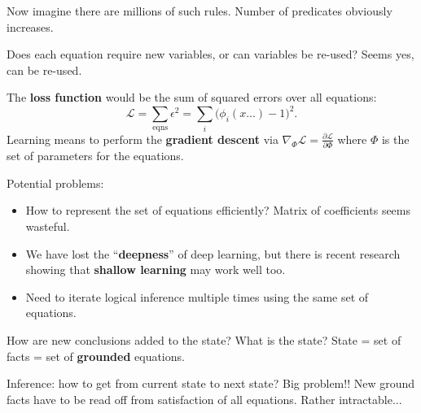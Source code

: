 Now imagine there are millions of such rules.  Number of predicates obviously increases.

Does each equation require new variables, or can variables be re-used? Seems yes, can be re-used.

The \textbf{loss function} would be the sum of squared errors over all equations:
\begin{equation}
\mathcal{L} = \sum_{\mathrm{eqns}} \epsilon^2 = \sum_i \big( \phi_i (x...) - 1 \big)^2 .
\label{loss-function}
\end{equation}
Learning means to perform the \textbf{gradient descent} via $ \nabla_\Phi \mathcal{L} = \frac{\partial \mathcal{L}}{\partial \Phi} $ where $\Phi$ is the set of parameters for the equations.

Potential problems:
\begin{itemize}
	\item How to represent the set of equations efficiently?  Matrix of coefficients seems wasteful.
	\item We have lost the ``\textbf{deepness}'' of deep learning, but there is recent research showing that \textbf{shallow learning} may work well too.
	\item Need to iterate logical inference multiple times using the same set of equations.
\end{itemize}

How are new conclusions added to the state?  What is the state?  State = set of facts = set of \textbf{grounded} equations.

Inference:  how to get from current state to next state?  Big problem!!  New ground facts have to be read off from satisfaction of all equations.  Rather intractable...

